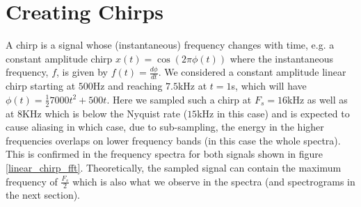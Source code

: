 \documentclass[10pt]{article}
\begin{document}
\section{Creating Chirps}
A chirp is a signal whose (instantaneous) frequency changes with time, e.g. a constant amplitude chirp $x(t) = \cos(2\pi\phi(t))$ where the instantaneous frequency, $f$, is given by $f(t) = \frac{d\phi}{dt}$. We considered a constant amplitude linear chirp starting at $500$Hz and reaching $7.5$kHz at $t=1$s, which will have $\phi(t) = \frac{1}{2}7000t^2 + 500t$. Here we sampled such a chirp at $F_s = 16$kHz as well as at $8$KHz which is below the Nyquist rate ($15$kHz in this case) and is expected to cause aliasing in which case, due to sub-sampling, the energy in the higher frequencies overlaps on lower frequency bands (in this case the whole spectra). This is confirmed in the frequency spectra for both signals shown in figure \ref{linear_chirp_fft}. Theoretically, the sampled signal can contain the maximum frequency of $\frac{F_s}{2}$ which is also what we observe in the spectra (and spectrograms in the next section).
\end{document}
